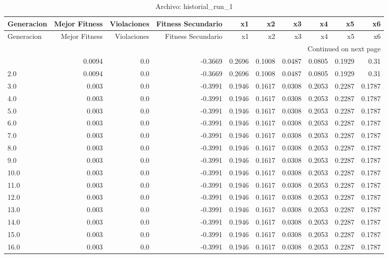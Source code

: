 \begin{longtable}{lrrrrrrrrr}
\caption{Archivo: historial\_run\_1}\label{tab:historial_run_1} \\
\toprule
Generacion & Mejor Fitness & Violaciones & Fitness Secundario & x1 & x2 & x3 & x4 & x5 & x6 \\
\midrule
\endfirsthead
\toprule
Generacion & Mejor Fitness & Violaciones & Fitness Secundario & x1 & x2 & x3 & x4 & x5 & x6 \\
\midrule
\endhead
\midrule
\multicolumn{10}{r}{Continued on next page} \\
\midrule
\endfoot
\bottomrule
\endlastfoot
1.0 & 0.0094 & 0.0 & -0.3669 & 0.2696 & 0.1008 & 0.0487 & 0.0805 & 0.1929 & 0.31 \\
2.0 & 0.0094 & 0.0 & -0.3669 & 0.2696 & 0.1008 & 0.0487 & 0.0805 & 0.1929 & 0.31 \\
3.0 & 0.003 & 0.0 & -0.3991 & 0.1946 & 0.1617 & 0.0308 & 0.2053 & 0.2287 & 0.1787 \\
4.0 & 0.003 & 0.0 & -0.3991 & 0.1946 & 0.1617 & 0.0308 & 0.2053 & 0.2287 & 0.1787 \\
5.0 & 0.003 & 0.0 & -0.3991 & 0.1946 & 0.1617 & 0.0308 & 0.2053 & 0.2287 & 0.1787 \\
6.0 & 0.003 & 0.0 & -0.3991 & 0.1946 & 0.1617 & 0.0308 & 0.2053 & 0.2287 & 0.1787 \\
7.0 & 0.003 & 0.0 & -0.3991 & 0.1946 & 0.1617 & 0.0308 & 0.2053 & 0.2287 & 0.1787 \\
8.0 & 0.003 & 0.0 & -0.3991 & 0.1946 & 0.1617 & 0.0308 & 0.2053 & 0.2287 & 0.1787 \\
9.0 & 0.003 & 0.0 & -0.3991 & 0.1946 & 0.1617 & 0.0308 & 0.2053 & 0.2287 & 0.1787 \\
10.0 & 0.003 & 0.0 & -0.3991 & 0.1946 & 0.1617 & 0.0308 & 0.2053 & 0.2287 & 0.1787 \\
11.0 & 0.003 & 0.0 & -0.3991 & 0.1946 & 0.1617 & 0.0308 & 0.2053 & 0.2287 & 0.1787 \\
12.0 & 0.003 & 0.0 & -0.3991 & 0.1946 & 0.1617 & 0.0308 & 0.2053 & 0.2287 & 0.1787 \\
13.0 & 0.003 & 0.0 & -0.3991 & 0.1946 & 0.1617 & 0.0308 & 0.2053 & 0.2287 & 0.1787 \\
14.0 & 0.003 & 0.0 & -0.3991 & 0.1946 & 0.1617 & 0.0308 & 0.2053 & 0.2287 & 0.1787 \\
15.0 & 0.003 & 0.0 & -0.3991 & 0.1946 & 0.1617 & 0.0308 & 0.2053 & 0.2287 & 0.1787 \\
16.0 & 0.003 & 0.0 & -0.3991 & 0.1946 & 0.1617 & 0.0308 & 0.2053 & 0.2287 & 0.1787 \\

\end{longtable}
